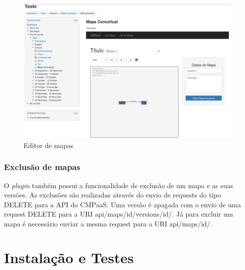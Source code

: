 \documentclass[
	12pt,				%
	openright,			%
	oneside,			%
	a4paper,			%
	english,			%
	french,				%
	spanish,			%
	brazil				%
	]{abntex2}
\begin{document}
\begin{figure}[htb]
	\caption{\label{fig_editor} Editor de mapas}
	\begin{center}
		\includegraphics[scale=0.2]{editor.png}
	\end{center}
\end{figure}

\subsection{Exclusão de mapas} 

O \textit{plugin} também possui a funcionalidade de exclusão de um mapa e as suas versões. As exclusões são realizadas através do envio de requests do tipo DELETE para a API do CMPaaS. Uma versão é apagada com o envio de uma request DELETE para a URI api/maps/id/versions/id/. Já para excluir um mapa é necessário enviar a mesma request para a URI api/maps/id/.   

\chapter{Instalação e Testes}
\end{document}
